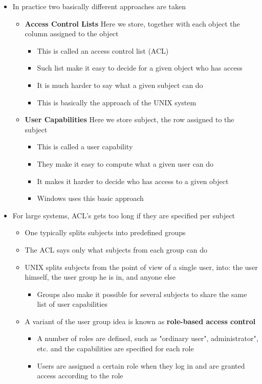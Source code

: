 \documentclass[11pt]{article}
\begin{document}
\begin{itemize}
\item In practice two basically different approaches are taken
\begin{itemize}
\item \textbf{Access Control Lists} Here we store, together with each object the column assigned to the object
\begin{itemize}
\item This is called an access control list (ACL)
\item Such list make it easy to decide for a given object who has access
\item It is much harder to say what a given subject can do
\item This is basically the approach of the UNIX system
\end{itemize}
\item \textbf{User Capabilities} Here we store subject, the row assigned to the subject
\begin{itemize}
\item This is called a user capability
\item They make it easy to compute what a given user can do
\item It makes it harder to decide who has access to a given object
\item Windows uses this basic approach
\end{itemize}
\end{itemize}

\item For large systems, ACL's gets too long if they are specified per subject
\begin{itemize}
\item One typically splits subjects into predefined groups
\item The ACL says only what subjects from each group can do
\item UNIX splits subjects from the point of view of a single user, into: the user himself, the user group he is in, and anyone else
\begin{itemize}
\item Groups also make it possible for several subjects to share the same list of user capabilities
\end{itemize}
\item A variant of the user group idea is known as \textbf{role-based access control}
\begin{itemize}
\item A number of roles are defined, such as "ordinary user", administrator", etc. and the capabilities are specified for each role
\item Users are assigned a certain role when they log in and are granted access according to the role
\end{itemize}
\end{itemize}
\end{itemize}
\end{document}
